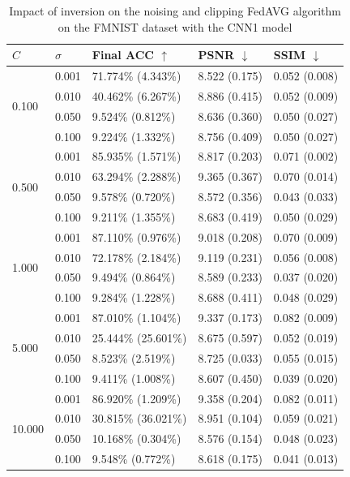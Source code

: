 \documentclass[conference,compsoc]{IEEEtran}
\begin{document}
\begin{table}[H]
\centering
\caption{Impact of inversion on the noising and clipping FedAVG algorithm on the FMNIST dataset with the CNN1 model}
\label{table:dp_fmnist_cnn1}
\begin{tabular}{lllll}
\hline
$C$ & $\sigma$ & \textbf{Final ACC} $\uparrow$ & \textbf{PSNR} $\downarrow$ & \textbf{SSIM} $\downarrow$ \\
\hline
\multirow{4}{*}{0.100} & 0.001 & 71.774\% (4.343\%) & 8.522 (0.175) & 0.052 (0.008) \\
& 0.010 & 40.462\% (6.267\%) & 8.886 (0.415) & 0.052 (0.009) \\
& 0.050 & 9.524\% (0.812\%) & 8.636 (0.360) & 0.050 (0.027) \\
& 0.100 & 9.224\% (1.332\%) & 8.756 (0.409) & 0.050 (0.027) \\
\hline
\multirow{4}{*}{0.500} & 0.001 & 85.935\% (1.571\%) & 8.817 (0.203) & 0.071 (0.002) \\
& 0.010 & 63.294\% (2.288\%) & 9.365 (0.367) & 0.070 (0.014) \\
& 0.050 & 9.578\% (0.720\%) & 8.572 (0.356) & 0.043 (0.033) \\
& 0.100 & 9.211\% (1.355\%) & 8.683 (0.419) & 0.050 (0.029) \\
\hline
\multirow{4}{*}{1.000} & 0.001 & 87.110\% (0.976\%) & 9.018 (0.208) & 0.070 (0.009) \\
& 0.010 & 72.178\% (2.184\%) & 9.119 (0.231) & 0.056 (0.008) \\
& 0.050 & 9.494\% (0.864\%) & 8.589 (0.233) & 0.037 (0.020) \\
& 0.100 & 9.284\% (1.228\%) & 8.688 (0.411) & 0.048 (0.029) \\
\hline
\multirow{4}{*}{5.000} & 0.001 & 87.010\% (1.104\%) & 9.337 (0.173) & 0.082 (0.009) \\
& 0.010 & 25.444\% (25.601\%) & 8.675 (0.597) & 0.052 (0.019) \\
& 0.050 & 8.523\% (2.519\%) & 8.725 (0.033) & 0.055 (0.015) \\
& 0.100 & 9.411\% (1.008\%) & 8.607 (0.450) & 0.039 (0.020) \\
\hline
\multirow{4}{*}{10.000} & 0.001 & 86.920\% (1.209\%) & 9.358 (0.204) & 0.082 (0.011) \\
& 0.010 & 30.815\% (36.021\%) & 8.951 (0.104) & 0.059 (0.021) \\
& 0.050 & 10.168\% (0.304\%) & 8.576 (0.154) & 0.048 (0.023) \\
& 0.100 & 9.548\% (0.772\%) & 8.618 (0.175) & 0.041 (0.013) \\
\hline
\end{tabular}
\end{table}
\end{document}
